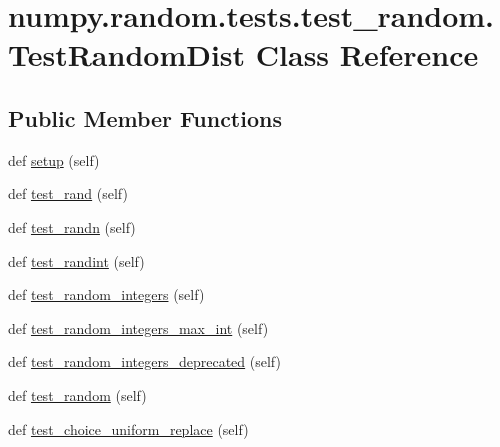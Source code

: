 \hypertarget{classnumpy_1_1random_1_1tests_1_1test__random_1_1TestRandomDist}{}\section{numpy.\+random.\+tests.\+test\+\_\+random.\+Test\+Random\+Dist Class Reference}
\label{classnumpy_1_1random_1_1tests_1_1test__random_1_1TestRandomDist}
\subsection*{Public Member Functions}
\begin{DoxyCompactItemize}
\item 
def \hyperlink{classnumpy_1_1random_1_1tests_1_1test__random_1_1TestRandomDist_a532c47caea1d09de86f99cde56f025dc}{setup} (self)
\item 
def \hyperlink{classnumpy_1_1random_1_1tests_1_1test__random_1_1TestRandomDist_aeb7fa68d85d73ee8c74c38ef5258936e}{test\+\_\+rand} (self)
\item 
def \hyperlink{classnumpy_1_1random_1_1tests_1_1test__random_1_1TestRandomDist_ac8f884a37da1520e5d8ecff1b86e31cf}{test\+\_\+randn} (self)
\item 
def \hyperlink{classnumpy_1_1random_1_1tests_1_1test__random_1_1TestRandomDist_ac6670cbdf5e17451fff2ffafbdec63e3}{test\+\_\+randint} (self)
\item 
def \hyperlink{classnumpy_1_1random_1_1tests_1_1test__random_1_1TestRandomDist_ac20731070ef150f18e46d9d5c50ffe52}{test\+\_\+random\+\_\+integers} (self)
\item 
def \hyperlink{classnumpy_1_1random_1_1tests_1_1test__random_1_1TestRandomDist_afc65e078cad7e68830f89bb5d04a6c16}{test\+\_\+random\+\_\+integers\+\_\+max\+\_\+int} (self)
\item 
def \hyperlink{classnumpy_1_1random_1_1tests_1_1test__random_1_1TestRandomDist_a48637234186a92e286a4922951d6b874}{test\+\_\+random\+\_\+integers\+\_\+deprecated} (self)
\item 
def \hyperlink{classnumpy_1_1random_1_1tests_1_1test__random_1_1TestRandomDist_a600535ba7cc057aaa65a201e9cbb6170}{test\+\_\+random} (self)
\item 
def \hyperlink{classnumpy_1_1random_1_1tests_1_1test__random_1_1TestRandomDist_a818241f3d2dc7605efbda9a745abfeec}{test\+\_\+choice\+\_\+uniform\+\_\+replace} (self)
\item 

\end{DoxyCompactItemize}
